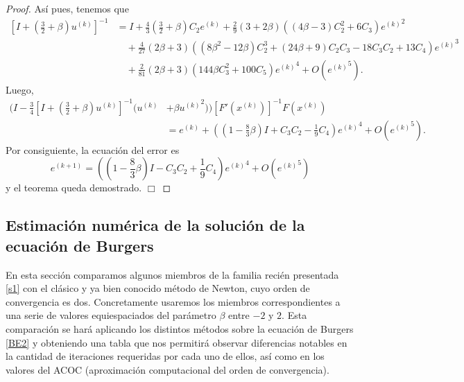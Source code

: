 \begin{proof}
	Así pues, tenemos que
	\begin{equation*}
	\begin{split}
	{[I + (\frac{3}{2} + \beta ){u^{(k)}}]^{ - 1}}
	&= I + \frac{4}{3}(\frac{3}{2} + \beta ){C_2}{e^{(k)}} + \frac{2}{9}(3 + 2\beta )((4\beta  - 3)C_2^2 + 6{C_3}){e^{(k)}}^2 \\
	&\quad + \frac{4}{{27}}(2\beta  + 3) ((8{\beta ^2} - 12\beta )C_2^3+ (24\beta  + 9){C_2}{C_3} - 18{C_3}{C_2} + 13{C_4}){e^{(k)}}^3 \\
	&\quad+ \frac{2}{{81}}(2\beta  + 3) (144\beta C_3^2 +
	100{C_5}){e^{(k)}}^4 + O({e^{(k)}}^5).
	\end{split}
	\end{equation*}
	Luego,
	\begin{equation*}
	\begin{split}
	(I - \frac{3}{4}{[I + (\frac{3}{2} + \beta ){u^{(k)}}]^{ - 1}}({u^{(k)}}& + \beta {u^{(k)}}^2)){[{F'}({x^{(k)}})]^{ - 1}}F({x^{(k)}})\\
	&= {e^{(k)}} + ( \left(1 - \frac{8}{3}\beta\right)I + {C_3}{C_2} -
	\frac{1}{9}{C_4}){e^{(k)}}^4  + O({e^{(k)}}^5).
	\end{split}
	\end{equation*}
	Por consiguiente, la ecuación del error es
	\begin{equation*}%
	{e^{(k + 1)}} = \left( \left(1 - \frac{8}{3}\beta\right)I - {C_3}{C_2} +
	\frac{1}{9}{C_4} \right) {e^{(k)}}^4 + O({e^{(k)}}^5)
	\end{equation*}
	y el teorema queda demostrado. $\Box$	
\end{proof}

\subsection{Estimación numérica de la solución de la ecuación de Burgers}\label{lichenburger}
En esta sección comparamos algunos miembros de la familia recién presentada \eqref{s1} con el clásico y ya bien conocido método de Newton, cuyo orden de convergencia es dos. Concretamente usaremos los miembros correspondientes a una serie de valores equiespaciados del parámetro $\beta$ entre $-2$ y $2$. Esta comparación se hará aplicando los distintos métodos sobre la ecuación de Burgers \eqref{BE2} y obteniendo una tabla que nos permitirá observar diferencias notables en la cantidad de iteraciones requeridas por cada uno de ellos, así como en los valores del ACOC (aproximación computacional del orden de convergencia).

